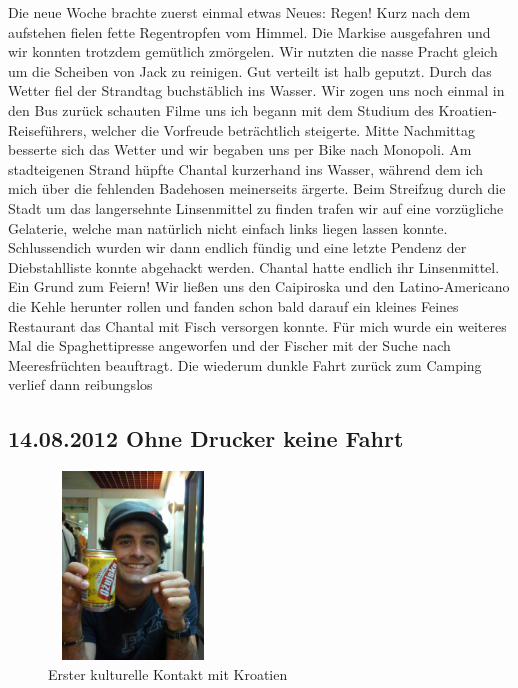 Die neue Woche brachte zuerst einmal etwas Neues: Regen! Kurz nach dem aufstehen fielen fette Regentropfen vom Himmel.
Die Markise ausgefahren und wir konnten trotzdem gemütlich zmörgelen.
Wir nutzten die nasse Pracht gleich um die Scheiben von Jack zu reinigen.
Gut verteilt ist halb geputzt.
Durch das Wetter fiel der Strandtag buchstäblich ins Wasser.
Wir zogen uns noch einmal in den Bus zurück schauten Filme uns ich begann mit dem Studium des Kroatien-Reiseführers, welcher die Vorfreude beträchtlich steigerte.
Mitte Nachmittag besserte sich das Wetter und wir begaben uns per Bike nach Monopoli.
Am stadteigenen Strand hüpfte Chantal kurzerhand ins Wasser, während dem ich mich über die fehlenden Badehosen meinerseits ärgerte.
Beim Streifzug durch die Stadt um das langersehnte Linsenmittel zu finden trafen wir auf eine vorzügliche Gelaterie, welche man natürlich nicht einfach links liegen lassen konnte.
Schlussendich wurden wir dann endlich fündig und eine letzte Pendenz der Diebstahlliste konnte abgehackt werden.
Chantal hatte endlich ihr Linsenmittel.
Ein Grund zum Feiern! Wir ließen uns den Caipiroska und den Latino-Americano die Kehle herunter rollen und fanden schon bald darauf ein kleines Feines Restaurant das Chantal mit Fisch versorgen konnte.
Für mich wurde ein weiteres Mal die Spaghettipresse angeworfen und der Fischer mit der Suche nach Meeresfrüchten beauftragt.
Die wiederum dunkle Fahrt zurück zum Camping verlief dann reibungslos

\subsection{14.08.2012 Ohne Drucker keine Fahrt}

\begin{figure} 
  \begin{centering}
    \includegraphics[width=0.4\textwidth, height=5cm, keepaspectratio]{../Bilder/Sommer2012/62.jpg}
    \caption{Erster kulturelle Kontakt mit Kroatien}
  \end{centering}
\end{figure} 

